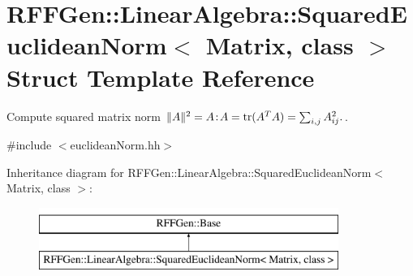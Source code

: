 \hypertarget{structRFFGen_1_1LinearAlgebra_1_1SquaredEuclideanNorm}{\section{R\-F\-F\-Gen\-:\-:Linear\-Algebra\-:\-:Squared\-Euclidean\-Norm$<$ Matrix, class $>$ Struct Template Reference}
\label{structRFFGen_1_1LinearAlgebra_1_1SquaredEuclideanNorm}
}


Compute squared matrix norm $ \|A\|^2 = A\negthinspace : \negthinspace A = \mathrm{tr}(A^TA) = \sum_{i,j} A_{ij}^2. $.  




{\ttfamily \#include $<$euclidean\-Norm.\-hh$>$}

Inheritance diagram for R\-F\-F\-Gen\-:\-:Linear\-Algebra\-:\-:Squared\-Euclidean\-Norm$<$ Matrix, class $>$\-:\begin{figure}[H]
\begin{center}
\leavevmode
\includegraphics[height=2.000000cm]{structRFFGen_1_1LinearAlgebra_1_1SquaredEuclideanNorm}
\end{center}
\end{figure}
